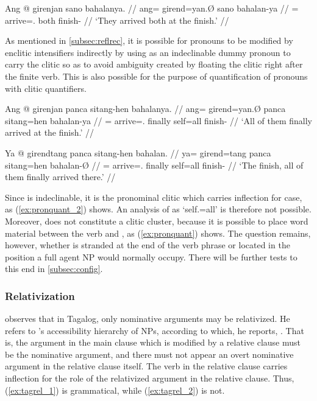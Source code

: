 \ex\begingl
\gla Ang @ girenjan sano bahalanya. //
\glb ang= girend=yan.Ø sano bahalan-ya //
\glc \AgtT{}= arrive=\TplM{}.\Aarg{} both finish-\Loc{} //
\glft `They arrived both at the finish.' //
\endgl\xe

As mentioned in \autoref{subsec:reflrec}, it is possible for pronouns to be
modified by enclitic intensifiers indirectly by using
 as an indeclinable dummy pronoun to carry the clitic
so as to avoid ambiguity created by floating the clitic right after the finite
verb. This is also possible for the purpose of quantification of pronouns with
clitic quantifiers.

\pex\label{ex:pronquant}
\a\label{ex:pronquant_1}\begingl
	\gla Ang @ girenjan panca sitang-hen bahalanya. //
	\glb ang= girend=yan.Ø panca sitang=hen bahalan-ya //
	\glc \AgtT{}= arrive=\TplM{}.\Aarg{} finally self=all finish-\Loc{} //
	\glft `All of them finally arrived at the finish.' //
\endgl

\a\label{ex:pronquant_2}\begingl
	\gla Ya @ girendtang panca sitang-hen bahalan. //
	\glb ya= girend=tang panca sitang=hen bahalan-Ø //
	\glc \LocT{}= arrive=\TplM{}.\Aarg{} finally self=all finish-\Top{} //
	\glft `The finish, all of them finally arrived there.' //
\endgl
\xe

Since  is indeclinable, it is the pronominal clitic which
carries inflection for case, as (\ref{ex:pronquant_2}) shows. An analysis of
 as `self.\Top{}=all' is therefore not possible.
Moreover,  does not constitute a clitic
cluster, because it is possible to place word material between the verb and
, as (\ref{ex:pronquant}) shows. The question
remains, however, whether  is stranded at the end
of the verb phrase or located in the position a full agent NP would normally
occupy. There will be further tests to this end in \autoref{subsec:config}.

\subsubsection{Relativization}
\label{subsubsec:relz}

\citet{kroeger1991} observes that in Tagalog, only nominative arguments may be
relativized. He refers to \citet{keenancomrie1977}'s accessibility hierarchy of
NPs, according to which, he reports, . That is, the argument in the main clause which is modified by a
relative clause must be the nominative argument, and there must not appear an
overt nominative argument in the relative clause itself. The verb in the
relative clause carries inflection for the role of the relativized argument in
the relative clause. Thus, (\ref{ex:tagrel_1}) is grammatical, while 
(\ref{ex:tagrel_2}) is not.

